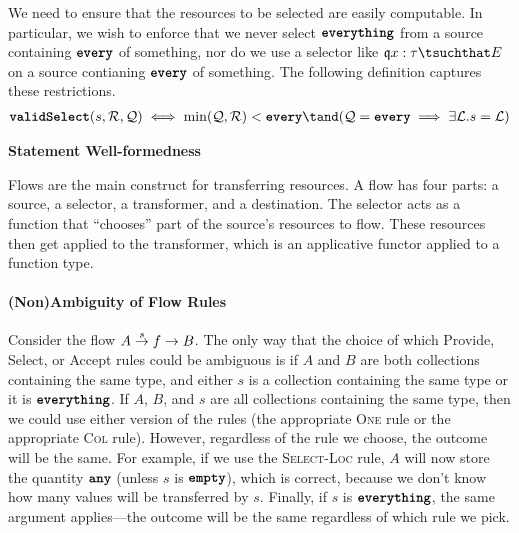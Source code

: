 \documentclass[dvipsnames, usenames, sigconf]{acmart}
\begin{document}
We need to ensure that the resources to be selected are easily computable.
In particular, we wish to enforce that we never select $\textbf{\texttt{everything}}$ from a source containing $\textbf{\texttt{every}}$ of something, nor do we use a selector like $\mathfrak{q} x : \tau \tsuchthat E$ on a source contianing $\textbf{\texttt{every}}$ of something.
The following definition captures these restrictions.
\begin{align*}
    \validSelect(s, \mathcal{R}, \mathcal{Q}) \iff \min(\mathcal{Q}, \mathcal{R}) < \every \tand (\mathcal{Q} = \every \implies \exists \mathcal{L}. s = \mathcal{L})
\end{align*}

 \textbf{Statement Well-formedness}


Flows are the main construct for transferring resources.
A flow has four parts: a source, a selector, a transformer, and a destination.
The selector acts as a function that ``chooses'' part of the source's resources to flow.
These resources then get applied to the transformer, which is an applicative functor applied to a function type.

\paragraph{(Non)Ambiguity of Flow Rules}
Consider the flow $A \stackrel{s}{\to} f \to B$.
The only way that the choice of which Provide, Select, or Accept rules could be ambiguous  is if $A$ and $B$ are both collections containing the same type, and either $s$ is a collection containing the same type or it is $\textbf{\texttt{everything}}$.
If $A$, $B$, and $s$ are all collections containing the same type, then we could use either version of the rules (the appropriate \textsc{One} rule or the appropriate \textsc{Col} rule).
However, regardless of the rule we choose, the outcome will be the same.
For example, if we use the \textsc{Select-Loc} rule, $A$ will now store the quantity $\textbf{\texttt{any}}$ (unless $s$ is $\textbf{\texttt{empty}}$), which is correct, because we don't know how many values will be transferred by $s$.
Finally, if $s$ is $\textbf{\texttt{everything}}$, the same argument applies---the outcome will be the same regardless of which rule we pick.
\end{document}
